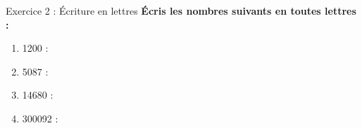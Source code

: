 \begin{exercisebox}{ Exercice 2 : Écriture en lettres }
	\textbf{Écris les nombres suivants en toutes lettres :}
	
	\begin{enumerate}[label=\textcolor{primary}{\textbf{\alph*)}},leftmargin=*]
		\item \num{1200} : \dotfill {} 
		\item \num{5087} : \dotfill {} \par \dotfill {}
		\item \num{14680} : \dotfill {} \par \dotfill {}
		\item \num{300092} : \dotfill {} \par \dotfill {}
	\end{enumerate}
\end{exercisebox}

